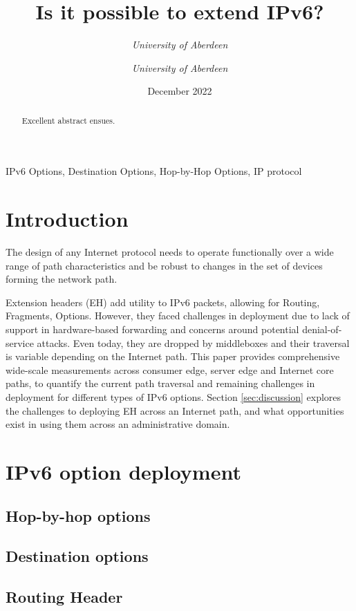 \documentclass[conference]{IEEEtran}
\title{Is it possible to extend IPv6?}
\date{December 2022}
\author{\IEEEauthorblockN{Ana Custura}
\IEEEauthorblockA{
\textit{University of Aberdeen}\\
}
\and
\IEEEauthorblockN{Raffaello Secchi}
\textit{University of Aberdeen}\\
\and
\IEEEauthorblockN{Gorry Fairhurst}
\textit{University of Aberdeen}\\
}
\begin{document}
\maketitle

\begin{abstract}
Excellent abstract ensues.
\end{abstract}

\begin{IEEEkeywords}
IPv6 Options, Destination Options, Hop-by-Hop Options, IP protocol
\end{IEEEkeywords}

\section{Introduction}
\label{sec:introduction}

The design of any Internet protocol needs to operate functionally over a wide
range of path characteristics and be robust to changes in the set of devices
forming the network path.  

Extension headers (EH) add utility to IPv6 packets, allowing for Routing, Fragments, Options.
However, they faced challenges in deployment due to lack of support in hardware-based forwarding and concerns around potential denial-of-service attacks. Even today, they are dropped by middleboxes and their traversal is variable depending on the Internet path.
This paper provides comprehensive wide-scale measurements across consumer edge, server edge and Internet core paths, to quantify the current path traversal and remaining challenges in deployment for different types of IPv6 options.
Section \ref{sec:discussion} explores the challenges to deploying EH across an Internet path, and what opportunities exist in using them across an administrative domain.

\section{IPv6 option deployment}
\label{sec:ipv6-option-deployment}
\subsection{Hop-by-hop options}
\subsection{Destination options}
\subsection{Routing Header}
\end{document}
